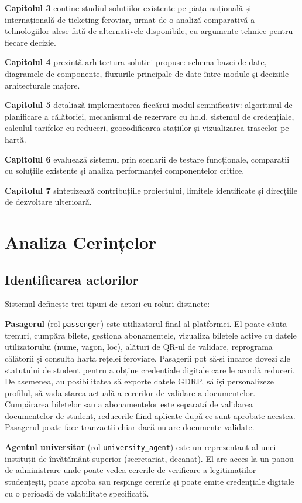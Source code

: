 \documentclass[12pt,a4paper]{report}
\begin{document}
\textbf{Capitolul 3} conține studiul soluțiilor existente pe piața națională și internațională de ticketing feroviar, urmat de o analiză comparativă a tehnologiilor alese față de alternativele disponibile, cu argumente tehnice pentru fiecare decizie.

\textbf{Capitolul 4} prezintă arhitectura soluției propuse: schema bazei de date, diagramele de componente, fluxurile principale de date între module și deciziile arhitecturale majore.

\textbf{Capitolul 5} detaliază implementarea fiecărui modul semnificativ: algoritmul de planificare a călătoriei, mecanismul de rezervare cu hold, sistemul de credențiale, calculul tarifelor cu reduceri, geocodificarea stațiilor și vizualizarea traseelor pe hartă.

\textbf{Capitolul 6} evaluează sistemul prin scenarii de testare funcționale, comparații cu soluțiile existente și analiza performanței componentelor critice.

\textbf{Capitolul 7} sintetizează contribuțiile proiectului, limitele identificate și direcțiile de dezvoltare ulterioară.


\chapter{Analiza Cerințelor}

\section{Identificarea actorilor}

Sistemul definește trei tipuri de actori cu roluri distincte:

\textbf{Pasagerul} (rol \texttt{passenger}) este utilizatorul final al platformei. El poate căuta trenuri, cumpăra bilete, gestiona abonamentele, vizualiza biletele active cu datele utilizatorului (nume, vagon, loc), alături de QR-ul de validare, reprograma călătorii și consulta harta rețelei feroviare. Pasagerii pot să-și încarce dovezi ale statutului de student pentru a obține credențiale digitale care le acordă reduceri. De asemenea, au posibilitatea să exporte datele GDRP, să își personalizeze profilul, să vada starea actuală a cererilor de validare a documentelor. Cumpărarea biletelor sau a abonamentelor este separată de validarea documentelor de student, reducerile fiind aplicate după ce sunt aprobate acestea. Pasagerul poate face tranzacții chiar dacă nu are documente validate.

\textbf{Agentul universitar} (rol \texttt{university\_agent}) este un reprezentant al unei instituții de învățământ superior (secretariat, decanat). El are acces la un panou de administrare unde poate vedea cererile de verificare a legitimațiilor studențești, poate aproba sau respinge cererile și poate emite credențiale digitale cu o perioadă de valabilitate specificată.
\end{document}
